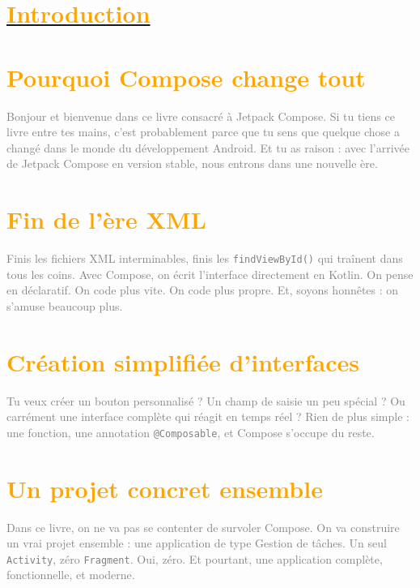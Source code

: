 \section{\hyperref[sec:sommaire]{\textcolor{orange}{Introduction}}}\label{sec:intro}

\noindent
\noindent
\begin{minipage}[t]{0.48\textwidth}
\section*{\footnotesize \textcolor{orange}{Pourquoi Compose change tout}\label{sec:intro}}

{\footnotesize \textcolor{gray}{
Bonjour et bienvenue dans ce livre consacré à Jetpack Compose.  
Si tu tiens ce livre entre tes mains, c’est probablement parce que tu sens que quelque chose a changé dans le monde du développement Android.  
Et tu as raison : avec l’arrivée de Jetpack Compose en version stable, nous entrons dans une nouvelle ère.
}}

 

\vspace{2em} %

\section*{\footnotesize \textcolor{orange}{Fin de l’ère XML}\label{sec:intro}}
{\footnotesize \textcolor{gray}{
Finis les fichiers XML interminables, finis les \texttt{findViewById()} qui traînent dans tous les coins.  
Avec Compose, on écrit l’interface directement en Kotlin.  
On pense en déclaratif.  
On code plus vite.  
On code plus propre.  
Et, soyons honnêtes : on s’amuse beaucoup plus.  
}}
\end{minipage}
\hfill
\begin{minipage}[t]{0.48\textwidth}
\section*{\footnotesize \textcolor{orange}{Création simplifiée d’interfaces}\label{sec:intro}}
{\footnotesize \textcolor{gray}{
Tu veux créer un bouton personnalisé ?  
Un champ de saisie un peu spécial ?  
Ou carrément une interface complète qui réagit en temps réel ?  
Rien de plus simple : une fonction, une annotation \texttt{@Composable}, et Compose s’occupe du reste.  
}}
\vspace{2em} %

\section*{\footnotesize \textcolor{orange}{Un projet concret ensemble}\label{sec:intro}}
{\footnotesize \textcolor{gray}{
Dans ce livre, on ne va pas se contenter de survoler Compose.  
On va construire un vrai projet ensemble : une application de type Gestion de tâches.  
Un seul \texttt{Activity}, zéro \texttt{Fragment}. Oui, zéro.  
Et pourtant, une application complète, fonctionnelle, et moderne.  
}}
\end{minipage}
